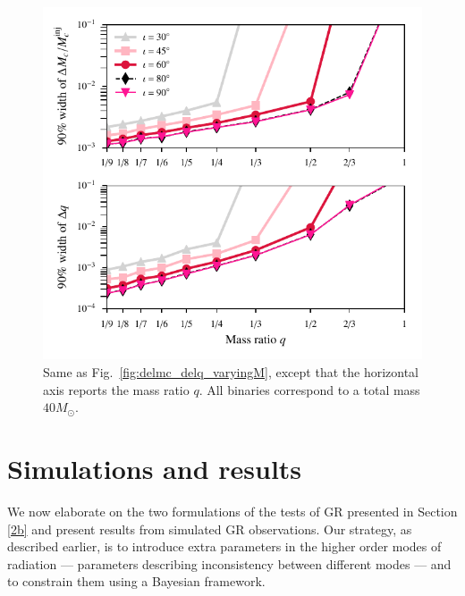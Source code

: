 \documentclass[prd,preprintnumbers,twocolumn,eqsecnum,floatfix,a4paper,nofootinbib,superscriptaddress]{revtex4}
\begin{document}
 \begin{figure}[tbh]
 	\begin{center}
 		\includegraphics[scale=0.8]{figs/hm_9dim_dmcbymcinj_dq_diff_q.pdf}
 	\end{center} 
 	\caption{Same as Fig.~\ref{fig:delmc_delq_varyingM}, except that the horizontal axis reports the mass ratio $q$. All binaries correspond to a total mass $40M_{\odot}$.}
 	\label{fig:delmc_delq_varyingq}
 \end{figure}

\section{Simulations and results}
\label{sec:simulations}

We now elaborate on the two formulations of the tests of GR presented in Section \ref{2b} and present results from simulated GR observations. Our strategy, as described earlier, is to introduce extra parameters in the higher order modes of radiation --- parameters describing inconsistency between different modes --- and to constrain them using a Bayesian framework. 
\end{document}
